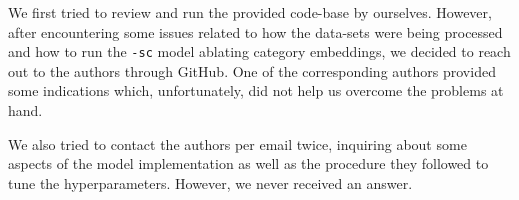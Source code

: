 We first tried to review and run the provided code-base by ourselves. However, after encountering some issues related to how the data-sets were being processed and how to run the \texttt{-sc} model ablating category embeddings, we decided to reach out to the authors through GitHub. One of the corresponding authors provided some indications which, unfortunately, did not help us overcome the problems at hand.

We also tried to contact the authors per email twice, inquiring about some aspects of the model implementation as well as the procedure they followed to tune the hyperparameters. However, we never received an answer.




